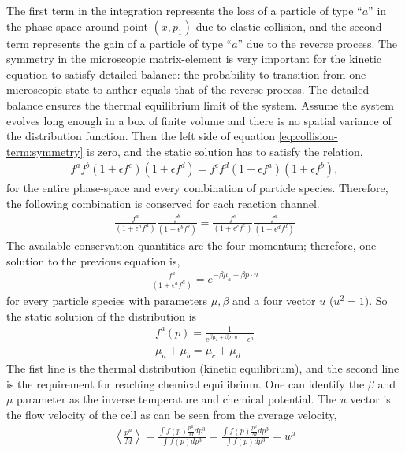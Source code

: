 The first term in the integration represents the loss of a particle of type ``$a$'' in the phase-space around point $(x, p_1)$ due to elastic collision, and the second term represents the gain of a particle of type ``$a$'' due to the reverse process.
The symmetry in the microscopic matrix-element is very important for the kinetic equation to satisfy detailed balance: the probability to transition from one microscopic state to anther equals  that of the reverse process.
The detailed balance ensures the thermal equilibrium limit of the system. 
Assume the system evolves long enough in a box of finite volume and there is no spatial variance of the distribution function.
Then the left side of equation \ref{eq:collision-term:symmetry} is zero, and the static solution has to satisfy the relation,
\begin{eqnarray}
f^a f^b (1+\epsilon f^c) (1+\epsilon f^d) = f^c f^d (1+\epsilon f^a) (1+\epsilon f^b),
\end{eqnarray}
for the entire phase-space and every combination of particle species.
Therefore, the following combination is conserved for each reaction channel.
 \begin{eqnarray}
\frac{f^a}{(1+\epsilon^a f^a)} \frac{f^b}{(1+\epsilon^b f^b)}
= \frac{f^c}{(1+\epsilon^c f^c)} \frac{f^d}{(1+\epsilon^d f^d)}
\end{eqnarray}
The available conservation quantities are the four momentum; therefore, one solution to the previous equation is,
\begin{eqnarray}
\frac{f^a}{(1+\epsilon^a f^a)} = e^{-\beta \mu_a-\beta p\cdot u}
\end{eqnarray}
for every particle species with parameters $\mu, \beta$ and a four vector $u$ ($u^2 = 1$). 
So the static solution of the distribution is 
\begin{eqnarray}
f^a(p) = \frac{1}{ e^{\beta \mu_a+\beta p\cdot u} - \epsilon^a} \label{eq:thermal}\\
\mu_a +\mu_b = \mu_c + \mu_d \label{eq:chem}
\end{eqnarray}
The fist line is the thermal distribution (kinetic equilibrium), and the second line is the requirement for reaching chemical equilibrium. 
One can identify the $\beta$ and $\mu$ parameter as the inverse temperature and chemical potential. The $u$ vector is the flow velocity of the cell as can be seen from the average velocity,
\begin{eqnarray}
\left\langle \frac{p^\mu}{M} \right\rangle = \frac{\int f(p) \frac{p^\mu}{M} dp^3}{\int f(p) dp^3} = \frac{\int f(p) \frac{p^\mu}{M} dp^3}{\int f(p) dp^3} = u^\mu
\end{eqnarray}

